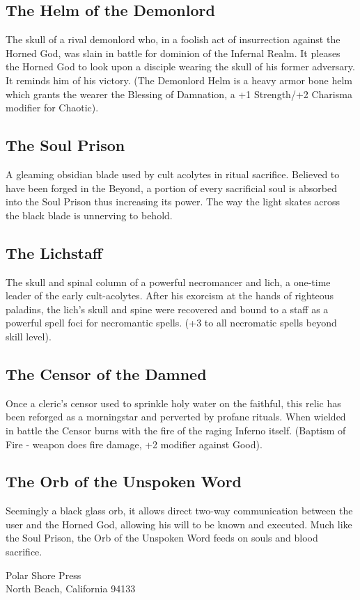 \documentclass[12pt]{article}
\begin{document}
\subsection{The Helm of the Demonlord}
The skull of a rival demonlord who, in a foolish
act of insurrection against the Horned God, was slain in battle for dominion of
the Infernal Realm. It pleases the Horned God to look upon a disciple wearing
the skull of his former adversary. It reminds him of his victory. (The
Demonlord Helm is a heavy armor bone helm which grants the wearer the Blessing
of Damnation, a +1 Strength/+2 Charisma modifier for Chaotic).

\subsection{The Soul Prison}
A gleaming obsidian blade used by cult acolytes in ritual
sacrifice. Believed to have been forged in the Beyond, a portion of every
sacrificial soul is absorbed into the Soul Prison thus increasing its power.
The way the light skates across the black blade is unnerving to behold.

\subsection{The Lichstaff}
The skull and spinal column of a powerful necromancer and lich,
a one-time leader of the early cult-acolytes. After his exorcism at the hands
of righteous paladins, the lich's skull and spine were recovered and bound to a
staff as a powerful spell foci for necromantic spells. (+3 to all necromatic
spells beyond skill level).

\subsection{The Censor of the Damned}
Once a cleric's censor used to sprinkle holy water on
the faithful, this relic has been reforged as a morningstar and perverted by
profane rituals. When wielded in battle the Censor burns with the fire of the
raging Inferno itself. (Baptism of Fire - weapon does fire damage, +2 modifier
against Good).

\subsection{The Orb of the Unspoken Word}
Seemingly a black glass orb, it allows direct
two-way communication between the user and the Horned God, allowing his will to
be known and executed. Much like the Soul Prison, the Orb of the Unspoken Word
feeds on souls and blood sacrifice.




\vfill
\begin{center}
{\selectfont 
Polar Shore Press\\North Beach, California 94133}
\end{center}
\end{document}
